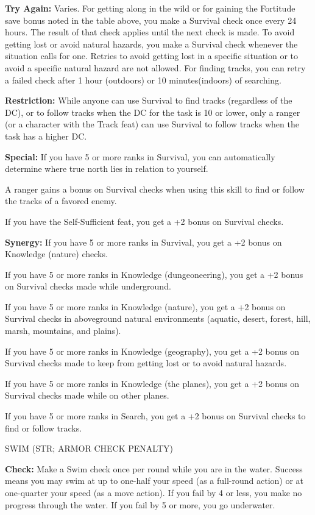 \documentclass{article}
\begin{document}
\textbf{Try Again:} Varies. For getting along in the wild or for gaining the Fortitude 
save bonus noted in the table above, you make a Survival check once every 24 hours. 
The result of that check applies until the next check is made. To avoid getting 
lost or avoid natural hazards, you make a Survival check whenever the situation 
calls for one. Retries to avoid getting lost in a specific situation or to avoid 
a specific natural hazard are not allowed. For finding tracks, you can retry a 
failed check after 1 hour (outdoors) or 10 minutes(indoors) of searching.

\textbf{Restriction:} While anyone can use Survival to find tracks (regardless 
of the DC), or to follow tracks when the DC for the task is 10 or lower, only a 
ranger (or a character with the Track feat) can use Survival to follow tracks when 
the task has a higher DC.

\textbf{Special:} If you have 5 or more ranks in Survival, you can automatically 
determine where true north lies in relation to yourself.

A ranger gains a bonus on Survival checks when using this skill to find or follow 
the tracks of a favored enemy.

If you have the Self-Sufficient feat, you get a +2 bonus on Survival checks.

\textbf{Synergy:} If you have 5 or more ranks in Survival, you get a +2 bonus on 
Knowledge (nature) checks.

If you have 5 or more ranks in Knowledge (dungeoneering), you get a +2 bonus on 
Survival checks made while underground.

If you have 5 or more ranks in Knowledge (nature), you get a +2 bonus on Survival 
checks in aboveground natural environments (aquatic, desert, forest, hill, marsh, 
mountains, and plains).

If you have 5 or more ranks in Knowledge (geography), you get a +2 bonus on Survival 
checks made to keep from getting lost or to avoid natural hazards.

If you have 5 or more ranks in Knowledge (the planes), you get a +2 bonus on Survival 
checks made while on other planes.

If you have 5 or more ranks in Search, you get a +2 bonus on Survival checks to 
find or follow tracks.

\vspace{12pt}
SWIM (STR; ARMOR CHECK PENALTY)

\textbf{Check:} Make a Swim check once per round while you are in the water. Success 
means you may swim at up to one-half your speed (as a full-round action) or at 
one-quarter your speed (as a move action). If you fail by 4 or less, you make no 
progress through the water. If you fail by 5 or more, you go underwater.
\end{document}
